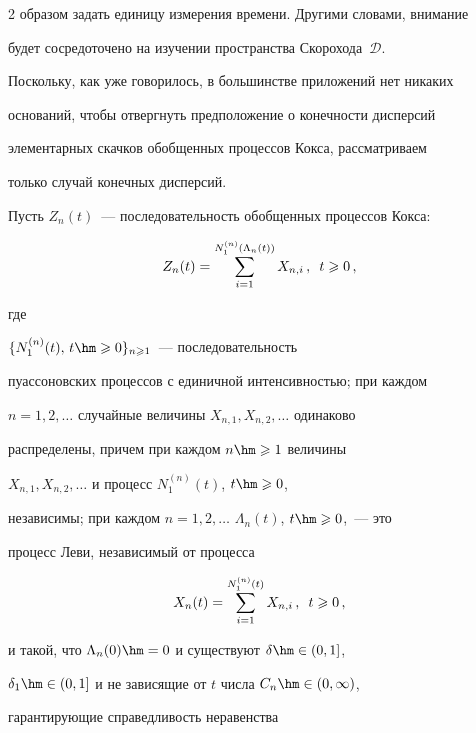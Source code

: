 \begin{multicols}{2}
образом задать единицу измерения времени. Другими словами, внимание

будет сосредоточено на изучении пространства Скорохода~$\mathcal{D}$.



Поскольку, как уже говорилось, в большинстве приложений нет никаких

оснований, чтобы отвергнуть предположение о конечности дисперсий

элементарных скачков обобщенных процессов Кокса, рассматриваем

только случай конечных дисперсий.



Пусть $Z_n(t)$~--- последовательность обобщенных процессов Кокса:

\begin{equation}

Z_n(t)=\sum\limits_{i=1}^{N^{(n)}_{1}(\Lambda_n(t))}X_{n,i}\,,\enskip

t\geqslant0\,,\label{e6-zaks}

\end{equation}

где

$\{N^{(n)}_{1}(t),\, t\hm\geqslant0\}_{n\geqslant1}$~--- последовательность

пуассоновских процессов с единичной интен\-сив\-ностью; при каждом

$n=1,2,\ldots$ случайные величины $X_{n,1},X_{n,2},\ldots$ одинаково

распределены, \mbox{причем} при каждом $n\hm\geqslant1$ величины

$X_{n,1},X_{n,2},\ldots$ и процесс $N^{(n)}_{1}(t)$, $t\hm\geqslant0$,

независимы; при каждом $n=1,2,\ldots$ $\Lambda_n(t)$, $t\hm\geqslant0$,~--- это

процесс Леви, независимый от процесса

\begin{equation}

X_n(t)=\sum\limits_{i=1}^{N^{(n)}_{1}(t)}X_{n,i}\,,\enskip t\geqslant 0\,,\label{e7-zaks}

\end{equation}

и такой, что $\Lambda_n(0)\hm=0$ и существуют $\delta\hm\in(0,1]$,

$\delta_1\hm\in(0,1]$ и не зависящие от $t$ числа $C_n\hm\in(0,\infty)$,

гарантирующие справедливость неравенства


\end{multicols}
